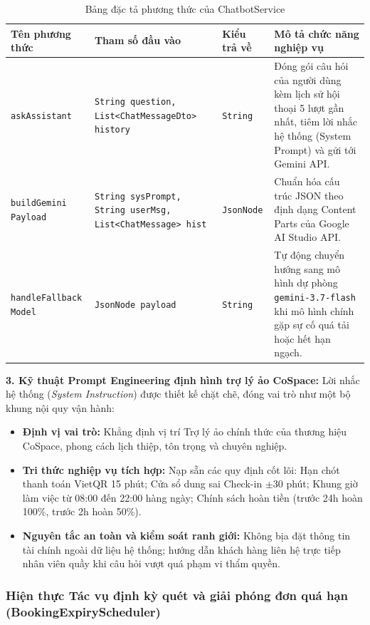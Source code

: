 \begin{table}[H]
\centering
\caption{Bảng đặc tả phương thức của ChatbotService}
\label{tab:spec-chatbot-service}
\renewcommand{\arraystretch}{1.3}
\begin{tabular}{|p{3.5cm}|p{3.5cm}|p{2.5cm}|p{5.5cm}|}
\hline
\textbf{Tên phương thức} & \textbf{Tham số đầu vào} & \textbf{Kiểu trả về} & \textbf{Mô tả chức năng nghiệp vụ} \\
\hline
\texttt{askAssistant} & \texttt{String question, List<ChatMessageDto> history} & \texttt{String} & Đóng gói câu hỏi của người dùng kèm lịch sử hội thoại 5 lượt gần nhất, tiêm lời nhắc hệ thống (System Prompt) và gửi tới Gemini API. \\
\hline
\texttt{buildGemini Payload} & \texttt{String sysPrompt, String userMsg, List<ChatMessage> hist} & \texttt{JsonNode} & Chuẩn hóa cấu trúc JSON theo định dạng Content Parts của Google AI Studio API. \\
\hline
\texttt{handleFallback Model} & \texttt{JsonNode payload} & \texttt{String} & Tự động chuyển hướng sang mô hình dự phòng \texttt{gemini-3.7-flash} khi mô hình chính gặp sự cố quá tải hoặc hết hạn ngạch. \\
\hline
\end{tabular}
\end{table}

\noindent\textbf{3. Kỹ thuật Prompt Engineering định hình trợ lý ảo CoSpace:}
Lời nhắc hệ thống (\textit{System Instruction}) được thiết kế chặt chẽ, đóng vai trò như một bộ khung nội quy vận hành:
\begin{itemize}
    \item \textbf{Định vị vai trò:} Khẳng định vị trí Trợ lý ảo chính thức của thương hiệu CoSpace, phong cách lịch thiệp, tôn trọng và chuyên nghiệp.
    \item \textbf{Tri thức nghiệp vụ tích hợp:} Nạp sẵn các quy định cốt lõi: Hạn chót thanh toán VietQR 15 phút; Cửa sổ dung sai Check-in $\pm 30$ phút; Khung giờ làm việc từ 08:00 đến 22:00 hàng ngày; Chính sách hoàn tiền (trước 24h hoàn 100\%, trước 2h hoàn 50\%).
    \item \textbf{Nguyên tắc an toàn và kiểm soát ranh giới:} Không bịa đặt thông tin tài chính ngoài dữ liệu hệ thống; hướng dẫn khách hàng liên hệ trực tiếp nhân viên quầy khi câu hỏi vượt quá phạm vi thẩm quyền.
\end{itemize}

\subsubsection{Hiện thực Tác vụ định kỳ quét và giải phóng đơn quá hạn (BookingExpiryScheduler)}

